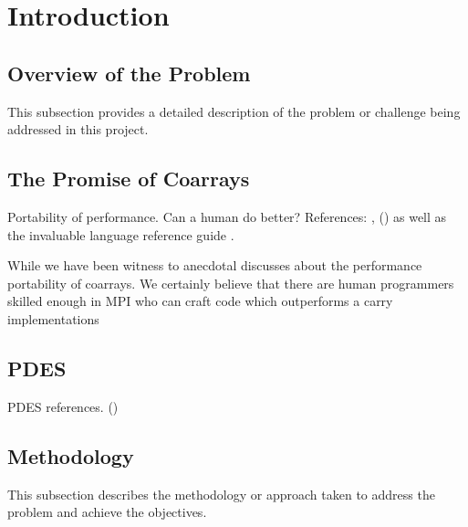 % 

\section{Introduction}  %

\subsection{Overview of the Problem}
This subsection provides a detailed description of the problem or challenge being addressed in this project.

\subsection{The Promise of Coarrays}
Portability	of performance. Can a human do better? References: \cite{numrich2018parallel, ray2019fortran}, (\cite{markus2012modern, clerman2011modern, Hanson2013}) as well as the invaluable language reference guide \cite{metcalf2024modern}.	

While we have been witness to anecdotal discusses about the performance portability of coarrays. We certainly believe that there are human programmers skilled enough in MPI who can craft code which outperforms a carry implementations

\subsection{PDES}
PDES references. (\cite{fujimoto1990parallel, fujimoto1993parallel, fujimoto2017parallel})

\subsection{Methodology}
This subsection describes the methodology or approach taken to address the problem and achieve the objectives.

\endinput  %
